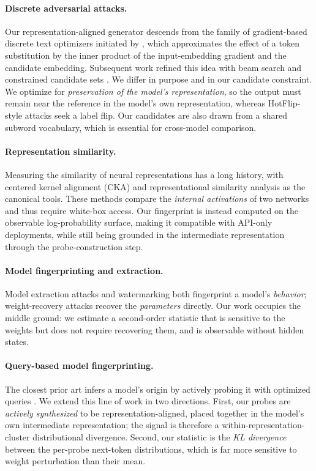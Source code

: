 \documentclass[11pt]{article}
\theoremstyle{definition}
\begin{document}
\paragraph{Discrete adversarial attacks.}
Our representation-aligned generator descends from the family of gradient-based
discrete text optimizers initiated by \citet{hotflip}, which approximates the
effect of a token substitution by the inner product of the input-embedding
gradient and the candidate embedding. Subsequent work refined this idea with
beam search and constrained candidate sets \citep{textfooler}. We differ in
purpose and in our candidate constraint. We optimize for \emph{preservation of
the model's representation}, so the output must remain near the reference in the
model's own representation, whereas HotFlip-style attacks seek a label flip. Our
candidates are also drawn from a shared subword vocabulary, which is essential
for cross-model comparison.

\paragraph{Representation similarity.}
Measuring the similarity of neural representations has a long history, with
centered kernel alignment (CKA) \citep{cka} and representational similarity
analysis \citep{rsa} as the canonical tools. These methods compare the
\emph{internal activations} of two networks and thus require white-box access.
Our fingerprint is instead computed on the observable log-probability surface,
making it compatible with API-only deployments, while still being grounded in
the intermediate representation through the probe-construction step.

\paragraph{Model fingerprinting and extraction.}
Model extraction attacks \citep{modelsteal} and watermarking
\citep{watermark} both fingerprint a model's \emph{behavior}; weight-recovery
attacks \citep{rolnick} recover the \emph{parameters} directly. Our work
occupies the middle ground: we estimate a second-order statistic that is
sensitive to the weights but does not require recovering them, and is
observable without hidden states.

\paragraph{Query-based model fingerprinting.}
The closest prior art infers a model's origin by actively probing it with
optimized queries \citep{teacherfingerprint}. We extend this line of work in
two directions. First, our probes are \emph{actively synthesized} to be
representation-aligned, placed together in the model's own intermediate
representation; the signal is therefore a within-representation-cluster
distributional divergence. Second, our statistic is the \emph{KL divergence}
between the per-probe next-token distributions, which is far more sensitive to
weight perturbation than their mean.
\end{document}
